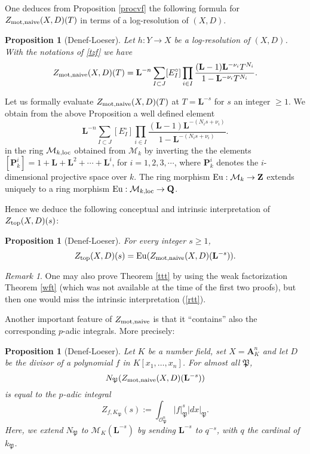 \documentclass[english,12pt]{amsart}
\let\got\mathfrak
\def\gP{{\got P}}
\def\AA{{\mathbf A}}
\def\LL{{\mathbf L}}
\def\PP{{\mathbf P}}
\def\QQ{{\mathbf Q}}
\def\ZZ{{\mathbf Z}}
\def\cM{{\mathcal M}}
\def\cO{{\mathcal O}}
\newtheorem{prop}[subsubsection]{Proposition}
\theoremstyle{definition}
\theoremstyle{remark}
\newtheorem{remark}[subsubsection]{Remark}
\theoremstyle{plain}
\numberwithin{equation}{subsection}
\let\got\mathfrak
\def\AA{{\mathbf A}}
\def\LL{{\mathbf L}}
\def\PP{{\mathbf P}}
\def\QQ{{\mathbf Q}}
\def\ZZ{{\mathbf Z}}
\def\cM{{\mathcal M}}
\def\cO{{\mathcal O}}
\begin{document}
One deduces from Proposition \ref{procvf} the following formula
for $Z_{\rm mot, naive} (X, D)  (T)$ in terms of a log-resolution of $(X, D)$.

\begin{prop}[Denef-Loeser]\label{nmz}Let  $h : Y \rightarrow X$ be a log-resolution of $(X, D)$.
With the notations of \ref{tzf} we have
$$
Z_{\rm mot, naive} (X, D)  (T) = 
\LL^{-n} 
\sum_{I \subset J} [E_I^{\circ}]
\prod_{i \in I}\frac{(\LL- 1)\LL^{- \nu_i}T^{N_i}}{1 - \LL^{- \nu_i}T^{N_i}}.
$$
\end{prop}

Let us formally
evaluate $Z_{\rm mot, naive} (X, D)  (T)$ at $T = \LL^{-s}$ for $s$ an integer $ \geq 1$.
We obtain from the above Proposition a well defined element
$$
\LL^{-n} 
\sum_{I \subset J} [E_I^{\circ}]
\prod_{i \in I}\frac{(\LL- 1)\LL^{- (N_i s + \nu_i)}}{1 - \LL^{- (N_i s + \nu_i)}}.
$$
in the ring $\cM_{k, {\rm loc}}$ obtained from
$\cM_k$ by inverting the the
elements $[\PP^i_k] = 1 + \LL + \LL^2 + \cdots + \LL^i$, for $i =
1,2,3,\cdots$, where $\PP^i_k$ denotes the $i$-dimensional projective space
over $k$.
The ring morphism
${\rm Eu}  : \cM_k \rightarrow \ZZ$
extends uniquely to a ring morphism
${\rm Eu}  : \cM_{k, {\rm loc}} \rightarrow \QQ$.

Hence we deduce the following conceptual and intrinsic
interpretation of
$Z_{\rm top} (X, D) (s)$:

\begin{prop}[Denef-Loeser]For every integer $s \geq 1$,
\begin{equation}\label{rtt}
Z_{\rm top} (X, D) (s) 
={\rm Eu} (Z_{\rm mot, naive} (X, D)  (\LL^{-s})).
\end{equation}
\end{prop}

\begin{remark}One may also prove  Theorem \ref{ttt} by
using
the weak factorization Theorem \ref{wft} (which was not available at the time
of the first two proofs), but then one would miss 
the intrinsic interpretation (\ref{rtt}).
\end{remark}


Another important feature of $Z_{\rm mot, naive} $ is that it  ``contains'' also
the corresponding $p$-adic integrals. More precisely:


\begin{prop}[Denef-Loeser]\label{gyg}Let  $K$ be
a number field, set $X = \AA^n_K$ and let $D$ be the divisor of
a polynomial $f $ in $K [x_1, \dots, x_n]$.
For almost all $\gP$, $$N_{\gP} (Z_{\rm mot, naive} (X, D)  (\LL^{-s}))$$ is equal to 
the $p$-adic integral 
$$Z_{f, K_{\gP}} (s) := \int_{\cO_{\gP}^n} \vert f\vert_{\gP}^s \vert dx \vert_{\gP}.$$
Here, we extend $N_{\gP}$ to $\cM_K (\LL^{- s})$ by sending
$\LL^{- s}$ to $q^{-s}$, with $q$ the cardinal of $k_{\gP}$.
\end{prop}
\end{document}
